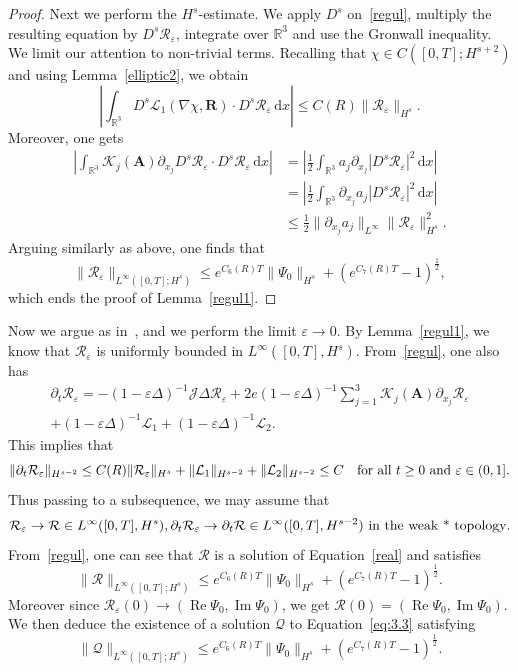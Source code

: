 \documentclass[10pt]{amsart}
\theoremstyle{definition}\newtheorem{defi}[theo]{Definition}\newtheorem{rema}[theo]{Remark}\newtheorem{exam}[theo]{Example}\newtheorem{exem}[theo]{Example}\newtheorem{nota}[theo]{Notation}
\newcommand{\BA}{\mathbf{A}}
\newcommand{\BR}{\mathbf{R}}
\newcommand{\R}{\mathbb{R}}
\DeclareMathOperator{\IM}{Im}
\DeclareMathOperator{\RE}{Re}
\newcommand*{\dd}{\mathrm{d}}
\newcommand*{\dx}{\dd x}
\begin{document}
\begin{proof}
Next we perform the $H^s$-estimate. We apply $D^s$ on~\eqref{regul}, multiply the resulting equation by $D^s \mathcal{R}_\varepsilon$, integrate over $\R^3$ and use the Gronwall inequality. We limit our attention to non-trivial terms. Recalling that $\chi \in C([0,T];H^{s+2})$ and using Lemma~\ref{elliptic2}, we obtain
\[
\left| \int_{\R^3} D^s \mathcal{L}_1(\nabla\chi, \BR)
\cdot D^s \mathcal{R}_\varepsilon \,\dx \right| \leq C(R) \| \mathcal{R}_\varepsilon \|_{H^s}.
\]
Moreover, one gets
\begin{align*}
\left| \int_{\R^3} \mathcal{K}_j(\BA) \partial_{x_j}D^s \mathcal{R}_\varepsilon
\cdot D^s \mathcal{R}_\varepsilon \,\dx \right| &= \left| \frac{1}{2} \int_{\R^3} a_j \partial_{x_j} |D^s\mathcal{R}_\varepsilon |^2 \,\dx \right | \\
&= \left| \frac{1}{2} \int_{\R^3} \partial_{x_j} a_j |D^s \mathcal{R}_\varepsilon |^2 \,\dx \right | \nonumber \\
&\leq \frac{1}{2} \| \partial_{x_j}a_j \|_{L^\infty} \| \mathcal{R}_\varepsilon \|_{H^s}^2.
\end{align*}
Arguing similarly as above, one finds that
\[
\| \mathcal{R}_\varepsilon \|_{L^\infty([0,T];H^s)}
\leq e^{C_6(R)T} \| \Psi_0 \|_{H^s} + (e^{C_7(R)T}-1)^{\frac{1}{2}},
\]
which ends the proof of Lemma~\ref{regul1}.
\end{proof}

Now we argue as in~\cite{BDS}, \cite{CG} and we perform the limit $\varepsilon \to 0$. By Lemma~\ref{regul1}, we know that $\mathcal{R}_{\varepsilon}$ is uniformly bounded in $L^{\infty}([0,T],H^s)$. From~\eqref{regul}, one also has
\begin{multline*}
\partial_t \mathcal{R}_{\varepsilon} = -(1-\varepsilon \Delta)^{-1} \mathcal{J} \Delta \mathcal{R}_{\varepsilon} +2e (1-\varepsilon \Delta)^{-1} \sum_{j=1}^3 \mathcal{K}_j(\BA) \partial_{x_j} \mathcal{R}_{\varepsilon} \\
 + (1-\varepsilon \Delta)^{-1} \mathcal{L}_1 + (1-\varepsilon \Delta)^{-1} \mathcal{L}_2.
\end{multline*}
This implies that
\[
\| \partial_t \mathcal{R}_{\varepsilon} \|_{H^{s-2}}
\le C(R) \| \mathcal{R}_{\varepsilon} \|_{H^s} +\| \mathcal{L}_1 \|_{H^{s-2}} + \| \mathcal{L}_2 \|_{H^{s-2}}
\le C \quad \hbox{for all} \ t \ge 0 \ \hbox{and} \ \varepsilon \in (0,1].
\]
Thus passing to a subsequence, we may assume that
\[
\mathcal{R}_{\varepsilon} \to \mathcal{R} \in L^{\infty}([0,T],H^s),
\partial_t \mathcal{R}_{\varepsilon} \to \partial_t \mathcal{R} \in L^{\infty}([0,T],H^{s-2})
\ \hbox{in the weak * topology}.
\]
From~\eqref{regul}, one can see that $\mathcal{R}$ is a solution of Equation~\eqref{real} and satisfies
\[
\| \mathcal{R} \|_{L^\infty([0,T];H^s)} \leq
e^{C_6(R)T} \| \Psi_0 \|_{H^s} + (e^{C_7(R)T}-1)^{\frac{1}{2}}.
\]
Moreover since $\mathcal{R}_{\varepsilon}(0) \to (\RE \Psi_0,\IM\Psi_0)$, we get $\mathcal{R}(0)=(\RE \Psi_0,\IM\Psi_0)$. We then deduce the existence of a solution $\mathcal{Q}$ to Equation~\eqref{eq:3.3} satisfying
\begin{equation}\label{esti1}
\| \mathcal{Q} \|_{L^\infty([0,T];H^s)} \leq e^{C_6(R)T} \| \Psi_0 \|_{H^s} + (e^{C_7(R)T}-1)^{\frac{1}{2}}.
\end{equation}
\end{document}
